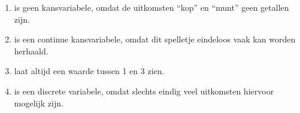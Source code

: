 \begin{enumerate}[label=(\alph*)]
    \item is geen kansvariabele, omdat de uitkomsten ``kop'' en ``munt'' geen getallen zijn.
    \item is een continue kansvariabele, omdat dit spelletje eindeloos vaak kan worden herhaald.
    \item laat altijd een waarde tussen 1 en 3 zien.
    \item is een discrete variabele, omdat slechts eindig veel uitkomsten hiervoor mogelijk zijn.
\end{enumerate}
